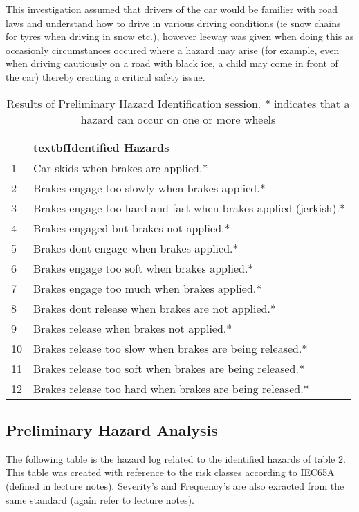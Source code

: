 \documentclass{article}
\begin{document}
\noindent
This investigation assumed that drivers of the car would be familier with road laws
and understand how to drive in various driving conditions (ie snow chains for tyres
when driving in snow etc.), however leeway was given when doing this as occasionly
circumstances occured where a hazard may arise (for example, even when driving 
cautiously on a road with black ice, a child may come in front of the car) thereby
creating a critical safety issue.\\


\begin{table}[h!tbp]
\begin{center}
\begin{tabular}{|l|l|}
\hline
	& textbf{Identified Hazards}		\\
\hline
1	&	Car skids when brakes are applied.*\\
2	&	Brakes engage too slowly when brakes applied.*\\
3	&	Brakes engage too hard and fast when brakes applied (jerkish).*\\
4	&	Brakes engaged but brakes not applied.*\\
5	&	Brakes dont engage when brakes applied.*\\
6	&	Brakes engage too soft when brakes applied.*\\
7	&	Brakes engage too much when brakes applied.*\\
8	&	Brakes dont release when brakes are not applied.*\\
9	&	Brakes release when brakes not applied.*\\
10	&	Brakes release too slow when brakes are being released.*\\
11	&	Brakes release too soft when brakes are being released.*\\
12	&	Brakes release too hard when brakes are being released.*\\
\hline
\end{tabular}
\end{center}
\caption{Results of Preliminary Hazard Identification session. * indicates 
that a hazard can occur on one or more wheels}
\label{fig:PHITable}
\end{table}

\newpage
\subsection{Preliminary Hazard Analysis}
\noindent
The following table is the hazard log related to the identified hazards of
table 2.  This table was created with reference to the risk classes
according to IEC65A (defined in lecture notes). Severity's and Frequency's
are also exracted from the same standard (again refer to lecture notes).\\
\end{document}

